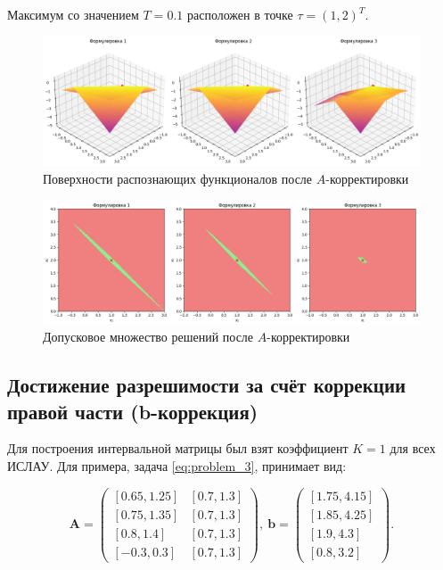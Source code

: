 \documentclass{article}
\begin{document}
  Максимум со значением \( T = 0.1 \) расположен в точке
  \( \tau = (1, 2)^T \).

  \begin{figure}[htbp!]
		\begin{center}
			\includegraphics[width = \textwidth]{tol_a_corrected}
			\caption{Поверхности распознающих функционалов после
        \( A \)-корректировки}
      \label{figure:tol_a_corrected}
		\end{center}
	\end{figure}

  \begin{figure}[htbp!]
		\begin{center}
			\includegraphics[width = \textwidth]{tol_functional_a_corrected}
			\caption{Допусковое множество решений после \( A \)-корректировки}
      \label{figure:tol_functional_a_corrected}
		\end{center}
	\end{figure}

  \subsection{Достижение разрешимости за счёт коррекции правой части
  (b-коррекция)}

  Для построения интервальной матрицы был взят коэффициент \( K = 1 \) для
  всех ИСЛАУ. Для примера, задача \ref{eq:problem_3}, принимает вид:

  \begin{equation*}
    \mathbf{A} = \begin{pmatrix}
      [0.65, 1.25] & [0.7, 1.3] \\
      [0.75, 1.35] & [0.7, 1.3] \\
      [0.8, 1.4] & [0.7, 1.3] \\
      [-0.3, 0.3] & [0.7, 1.3]
    \end{pmatrix},
    ~
    \mathbf{b} = \begin{pmatrix}
      [1.75, 4.15] \\
      [1.85, 4.25] \\
      [1.9, 4.3] \\
      [0.8, 3.2]
    \end{pmatrix}.
  \end{equation*}
\end{document}
